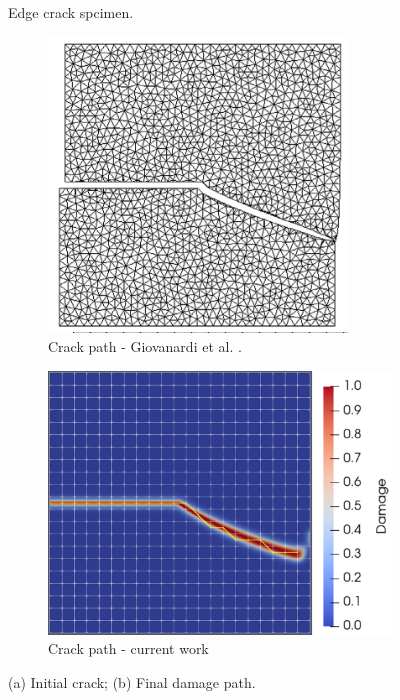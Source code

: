 \begin{figure}[ht]
    \centering
    \caption{Edge crack spcimen.}
    \label{fig:nonplanar_schematic}
\end{figure}

\begin{figure}[h]
    \begin{subfigure}{.45\textwidth}
      \centering
      \includegraphics[width=0.765\linewidth]{Chapter4/figures/nonplanar/curved_crack_result_bianca.png}
      \caption{Crack path - Giovanardi et al. \cite{giovanardi2017hybrid}.}
      \label{fig:reference result}
    \end{subfigure}%
    \begin{subfigure}{.54\textwidth}
      \centering
      \includegraphics[width=0.83\linewidth]{Chapter4/figures/nonplanar/nonplanar_example.png}
      \caption{Crack path - current work}
      \label{fig:crack_path}
    \end{subfigure}%
      \caption{(a) Initial crack; (b) Final damage path.} 
      \label{fig:nonplanar_example}
\end{figure}